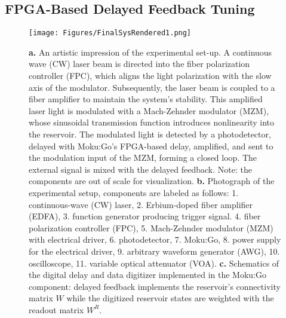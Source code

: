 \documentclass{WileyMSP-template}
\begin{document}
\subsection{FPGA-Based Delayed Feedback Tuning}
\begin{figure}[h]
  \centering
  \texttt{[image: Figures/FinalSysRendered1.png]}
  \caption{\textbf{a.} An artistic impression of the experimental set-up. A continuous wave (CW) laser beam is directed into the fiber polarization controller (FPC), which aligns the light polarization with the slow axis of the modulator. Subsequently, the laser beam is coupled to a fiber amplifier to maintain the system's stability. This amplified laser light is modulated with a Mach-Zehnder modulator (MZM), whose sinusoidal transmission function introduces nonlinearity into the reservoir. The modulated light is detected by a photodetector, delayed with Moku:Go's FPGA-based delay, amplified, and sent to the modulation input of the MZM, forming a closed loop. The external signal is mixed with the delayed feedback.  Note: the components are out of scale for visualization. \textbf{b.} Photograph of the experimental setup, components are labeled as follows: 1. continuous-wave (CW) laser, 2. Erbium-doped fiber amplifier (EDFA), 3. function generator producing trigger signal. 4. fiber polarization controller (FPC), 5. Mach-Zehnder modulator (MZM) with electrical driver, 6. photodetector, 7. Moku:Go, 8. power supply for the electrical driver, 9. arbitrary waveform generator (AWG), 10. oscilloscope, 11. variable optical attenuator (VOA). \textbf{c.} Schematics of the digital delay and data digitizer implemented in the Moku:Go component: delayed feedback implements the reservoir's connectivity matrix $W$ while the digitized reservoir states are weighted with the readout matrix $W^R$.}
  \label{fig:exp_setup}
\end{figure}
\end{document}
